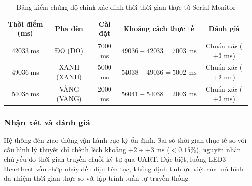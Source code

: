 \begin{table}[H]
\centering
\caption{Bảng kiểm chứng độ chính xác định thời thời gian thực từ Serial Monitor}
\label{tab:timing_lab1_ex5}
\begin{tabular}{|c|c|c|c|c|}
\hline
\textbf{Thời điểm (ms)} & \textbf{Pha đèn} & \textbf{Cài đặt} & \textbf{Khoảng cách thực tế} & \textbf{Đánh giá} \\
\hline
42033 ms & ĐỎ (DO) & 7000 ms & $49036 - 42033 = 7003\text{ ms}$ & Chuẩn xác ($+3\text{ ms}$) \\
49036 ms & XANH (XANH) & 5000 ms & $54038 - 49036 = 5002\text{ ms}$ & Chuẩn xác ($+2\text{ ms}$) \\
54038 ms & VÀNG (VANG) & 2000 ms & $56041 - 54038 = 2003\text{ ms}$ & Chuẩn xác ($+3\text{ ms}$) \\
\hline
\end{tabular}
\end{table}

\subsubsection{Nhận xét và đánh giá}
Hệ thống đèn giao thông vận hành cực kỳ ổn định. Sai số thời gian thực tế so với cấu hình lý thuyết chỉ chênh lệch khoảng $+2 \div +3\text{ ms}$ ($< 0.15\%$), nguyên nhân chủ yếu do thời gian truyền chuỗi ký tự qua UART. Đặc biệt, luồng LED3 Heartbeat vẫn chớp nháy đều đặn liên tục, khẳng định tính ưu việt của mô hình đa nhiệm thời gian thực so với lập trình tuần tự truyền thống.
